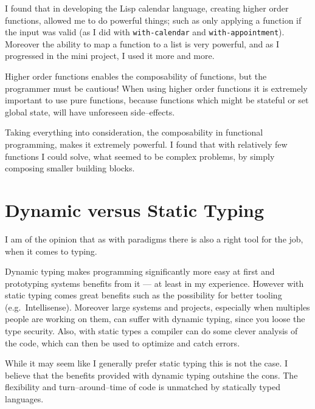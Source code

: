I found that in developing the Lisp calendar language, creating higher order functions, allowed me to do powerful things;
such as only applying a function if the input was valid (as I did with \texttt{with-calendar} and \texttt{with-appointment}).
Moreover the ability to map a function to a list is very powerful, and as I progressed in the mini project, I used it more and more.

Higher order functions enables the composability of functions, but the programmer must be cautious!
When using higher order functions it is extremely important to use pure functions, because functions which might be stateful or set global state, will have unforeseen side--effects.

\medskip
Taking everything into consideration, the composability in functional programming, makes it extremely powerful.
I found that with relatively few functions I could solve, what seemed to be complex problems, by simply composing smaller building blocks.

\section{Dynamic versus Static Typing}
I am of the opinion that as with paradigms there is also a right tool for the job,
when it comes to typing.

Dynamic typing makes programming significantly more easy at first and prototyping systems benefits from it --- at least in my experience.
However with static typing comes great benefits such as the possibility for better tooling (e.g.~Intellisense).
Moreover large systems and projects, especially when multiples people are working on them, can suffer with dynamic typing, since you loose the type security.
Also, with static types a compiler can do some clever analysis of the code, which can then be used to optimize and catch errors.

While it may seem like I generally prefer static typing this is not the case.
I believe that the benefits provided with dynamic typing outshine the cons.
The flexibility and turn--around--time of code is unmatched by statically typed languages.
